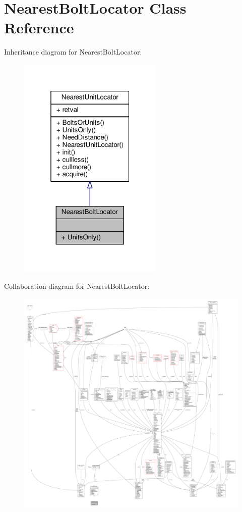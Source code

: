 \hypertarget{classNearestBoltLocator}{}\section{Nearest\+Bolt\+Locator Class Reference}
\label{classNearestBoltLocator}


Inheritance diagram for Nearest\+Bolt\+Locator\+:
\nopagebreak
\begin{figure}[H]
\begin{center}
\leavevmode
\includegraphics[width=196pt]{d8/de1/classNearestBoltLocator__inherit__graph}
\end{center}
\end{figure}


Collaboration diagram for Nearest\+Bolt\+Locator\+:
\nopagebreak
\begin{figure}[H]
\begin{center}
\leavevmode
\includegraphics[width=350pt]{d4/d7f/classNearestBoltLocator__coll__graph}
\end{center}
\end{figure}
